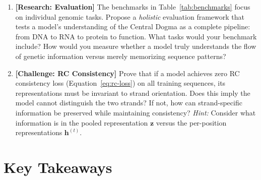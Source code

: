 \begin{enumerate}[label=\textbf{13.\arabic*.}, leftmargin=2.5em]
\item \textbf{[Research: Evaluation]} The benchmarks in Table~\ref{tab:benchmarks} focus on individual genomic tasks. Propose a \emph{holistic} evaluation framework that tests a model's understanding of the Central Dogma as a complete pipeline: from DNA to RNA to protein to function. What tasks would your benchmark include? How would you measure whether a model truly understands the flow of genetic information versus merely memorizing sequence patterns?

\item \textbf{[Challenge: RC Consistency]} Prove that if a model achieves zero RC consistency loss (Equation~\ref{eq:rc-loss}) on all training sequences, its representations must be invariant to strand orientation. Does this imply the model cannot distinguish the two strands? If not, how can strand-specific information be preserved while maintaining consistency? \emph{Hint:} Consider what information is in the pooled representation $\mathbf{z}$ versus the per-position representations $\mathbf{h}^{(t)}$.

\end{enumerate}

\section{Key Takeaways}

